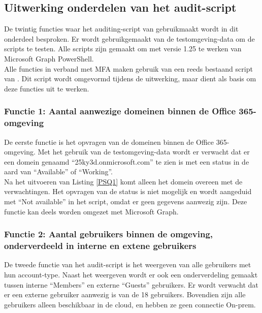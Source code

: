 \subsection{Uitwerking onderdelen van het audit-script}


De twintig functies waar het auditing-script van gebruikmaakt wordt in dit onderdeel besproken. Er wordt gebruikgemaakt van de testomgeving-data om de scripts te testen. Alle scripts zijn gemaakt om met versie 1.25 te werken van Microsoft Graph PowerShell. \\

Alle functies in verband met \ac{MFA} maken gebruik van een reeds bestaand script van \textcite{Allen2023}. Dit script wordt omgevormd tijdens de uitwerking, maar dient als basis om deze functies uit te werken.

\subsubsection{Functie 1: Aantal aanwezige domeinen binnen de Office 365-omgeving}

De eerste functie is het opvragen van de domeinen binnen de Office 365-omgeving. Met het gebruik van de testomgeving-data wordt er verwacht dat er een domein genaamd “25ky3d.onmicrosoft.com” te zien is met een status in de aard van “Available” of “Working”. \\

Na het uitvoeren van Listing \ref{PSQ1} komt alleen het domein overeen met de verwachtingen. Het opvragen van de status is niet mogelijk en wordt aangeduid met “Not available” in het script, omdat er geen gegevens aanwezig zijn. Deze functie kan deels worden omgezet met Microsoft Graph.

\subsubsection{Functie 2: Aantal gebruikers binnen de omgeving, onderverdeeld in interne en extene gebruikers}

De tweede functie van het audit-script is het weergeven van alle gebruikers met hun account-type. Naast het weergeven wordt er ook een onderverdeling gemaakt tussen interne “Members” en externe “Guests” gebruikers. Er wordt verwacht dat er een externe gebruiker aanwezig is van de 18 gebruikers. Bovendien zijn alle gebruikers alleen beschikbaar in de cloud, en hebben ze geen connectie \ac{On-prem}. \\


